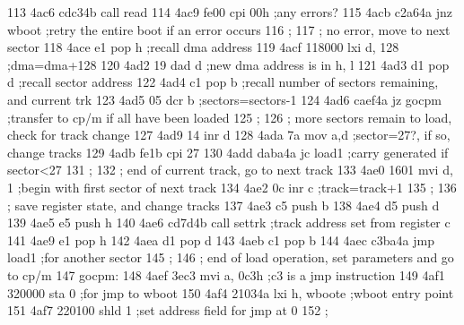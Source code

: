 113      4ac6 cdc34b               call   read
114      4ac9 fe00                 cpi    00h            ;any errors?
115      4acb c2a64a               jnz    wboot          ;retry the entire boot if an error occurs
116                       ;        
117                       ;        no error, move to next sector
118      4ace e1                   pop    h              ;recall dma address
119      4acf 118000               lxi    d, 128         ;dma=dma+128
120      4ad2 19                   dad    d              ;new dma address is in h, l
121      4ad3 d1                   pop    d              ;recall sector address
122      4ad4 c1                   pop    b              ;recall number of sectors remaining, and current trk
123      4ad5 05                   dcr    b              ;sectors=sectors-1
124      4ad6 caef4a               jz     gocpm          ;transfer to cp/m if all have been loaded
125                       ;
126                       ;        more sectors remain to load, check for track change
127      4ad9 14                   inr    d
128      4ada 7a                   mov    a,d            ;sector=27?, if so, change tracks
129      4adb fe1b                 cpi    27
130      4add daba4a               jc     load1          ;carry generated if sector<27
131                       ;
132                       ;        end of current track, go to next track
133      4ae0 1601                 mvi    d, 1           ;begin with first sector of next track
134      4ae2 0c                   inr    c              ;track=track+1
135                       ;
136                       ;        save register state, and change tracks
137      4ae3 c5                   push   b
138      4ae4 d5                   push   d
139      4ae5 e5                   push   h
140      4ae6 cd7d4b               call   settrk         ;track address set from register c
141      4ae9 e1                   pop    h
142      4aea d1                   pop    d
143      4aeb c1                   pop    b
144      4aec c3ba4a               jmp    load1          ;for another sector
145                       ;
146                       ;        end of load operation, set parameters and go to cp/m
147                       gocpm:
148      4aef 3ec3                 mvi    a, 0c3h        ;c3 is a jmp instruction
149      4af1 320000               sta    0              ;for jmp to wboot
150      4af4 21034a               lxi    h, wboote      ;wboot entry point
151      4af7 220100               shld   1              ;set address field for jmp at 0
152                       ;
